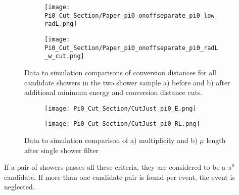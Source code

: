 \documentclass{article}
\begin{document}
 
\begin{figure}[t!]
\centering
  \begin{subfigure}[t]{0.4\textwidth}
    \centering
\texttt{[image: Pi0\_Cut\_Section/Paper\_pi0\_onoffseparate\_pi0\_low\_radL.png]}
  \caption{ }
  \end{subfigure} 
  \hspace{20mm}
  \begin{subfigure}[t]{0.4\textwidth}
    \centering
\texttt{[image: Pi0\_Cut\_Section/Paper\_pi0\_onoffseparate\_pi0\_radL\_w\_cut.png]}
  \caption{ }
  \end{subfigure} 
\caption{ Data to simulation comparisons of conversion distances for all candidate showers in the two shower sample a) before and b) after additional minimum energy and conversion distance cuts. }
\label{fig:physics_radl_before_after}
\end{figure}


\begin{figure}[t!]
\centering
  \begin{subfigure}[t]{0.4\textwidth}
    \centering
\texttt{[image: Pi0\_Cut\_Section/CutJust\_pi0\_E.png]}
  \caption{ }
  \end{subfigure} 
  \hspace{20mm}
  \begin{subfigure}[t]{0.4\textwidth}
    \centering
\texttt{[image: Pi0\_Cut\_Section/CutJust\_pi0\_RL.png]}
  \caption{ }
  \end{subfigure} 
\caption{ Data to simulation comparison of a) multiplicity and b) $\mu$ length after single shower filter }
\label{fig:cutjust_pi0_e}
\end{figure}

\par If a pair of showers passes all these criteria, they are considered to be a $\pi^0$ candidate. If more than one candidate pair is found per event, the event is neglected.



\end{document}
